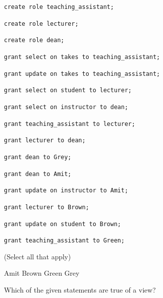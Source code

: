 \documentclass[12pt, addpoints]{exam}
\begin{document}
\begin{questions}
\begin{minipage}{\linewidth}
\texttt{create role teaching\_assistant;}\par
\texttt{create role lecturer;}\par
\texttt{create role dean;}\par\vspace{0.5em}
\texttt{grant select on takes to teaching\_assistant;}\par
\texttt{grant update on takes to teaching\_assistant;}\par\vspace{0.5em}
\texttt{grant select on student to lecturer;}\par
\texttt{grant select on instructor to dean;}\par
\texttt{grant teaching\_assistant to lecturer;}\par
\texttt{grant lecturer to dean;}\par\vspace{0.5em}
\texttt{grant dean to Grey;}\par
\texttt{grant dean to Amit;}\par
\texttt{grant update on instructor to Amit;}\par\vspace{0.5em}
\texttt{grant lecturer to Brown;}\par
\texttt{grant update on student to Brown;}\par\vspace{0.5em}
\texttt{grant teaching\_assistant to Green;}\par

(Select all that apply)\par\vspace{0.5em}
\begin{checkboxes}
    \CorrectChoice Amit
    \CorrectChoice Brown
    \choice Green
    \CorrectChoice Grey
\end{checkboxes}
\end{minipage}

\begin{minipage}{\linewidth}
\question[4]
Which of the given statements are true of a view?\par\vspace{0.5em}


\end{minipage}
\end{questions}
\end{document}
